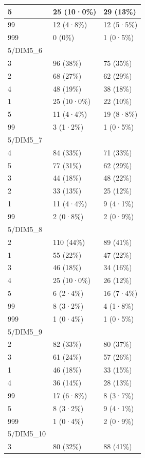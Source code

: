 \documentclass[
]{book}
\begin{document}
\begin{tabular}{l|l|l}
\hline
5 & 25 (10·0\%) & 29 (13\%)\\
\hline
99 & 12 (4·8\%) & 12 (5·5\%)\\
\hline
999 & 0 (0\%) & 1 (0·5\%)\\
\hline
5/DIM5\_6 &  & \\
\hline
3 & 96 (38\%) & 75 (35\%)\\
\hline
2 & 68 (27\%) & 62 (29\%)\\
\hline
4 & 48 (19\%) & 38 (18\%)\\
\hline
1 & 25 (10·0\%) & 22 (10\%)\\
\hline
5 & 11 (4·4\%) & 19 (8·8\%)\\
\hline
99 & 3 (1·2\%) & 1 (0·5\%)\\
\hline
5/DIM5\_7 &  & \\
\hline
4 & 84 (33\%) & 71 (33\%)\\
\hline
5 & 77 (31\%) & 62 (29\%)\\
\hline
3 & 44 (18\%) & 48 (22\%)\\
\hline
2 & 33 (13\%) & 25 (12\%)\\
\hline
1 & 11 (4·4\%) & 9 (4·1\%)\\
\hline
99 & 2 (0·8\%) & 2 (0·9\%)\\
\hline
5/DIM5\_8 &  & \\
\hline
2 & 110 (44\%) & 89 (41\%)\\
\hline
1 & 55 (22\%) & 47 (22\%)\\
\hline
3 & 46 (18\%) & 34 (16\%)\\
\hline
4 & 25 (10·0\%) & 26 (12\%)\\
\hline
5 & 6 (2·4\%) & 16 (7·4\%)\\
\hline
99 & 8 (3·2\%) & 4 (1·8\%)\\
\hline
999 & 1 (0·4\%) & 1 (0·5\%)\\
\hline
5/DIM5\_9 &  & \\
\hline
2 & 82 (33\%) & 80 (37\%)\\
\hline
3 & 61 (24\%) & 57 (26\%)\\
\hline
1 & 46 (18\%) & 33 (15\%)\\
\hline
4 & 36 (14\%) & 28 (13\%)\\
\hline
99 & 17 (6·8\%) & 8 (3·7\%)\\
\hline
5 & 8 (3·2\%) & 9 (4·1\%)\\
\hline
999 & 1 (0·4\%) & 2 (0·9\%)\\
\hline
5/DIM5\_10 &  & \\
\hline
3 & 80 (32\%) & 88 (41\%)\\
\hline

\end{tabular}
\end{document}
